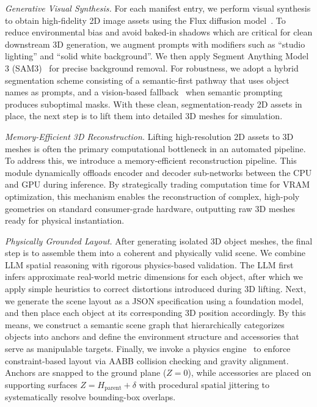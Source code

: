  \textit{Generative Visual Synthesis.} For each manifest entry, we perform visual synthesis to obtain high-fidelity 2D image assets using the Flux diffusion model~\cite{flux2024}. To reduce environmental bias and avoid baked-in shadows which are critical for clean downstream 3D generation, we augment prompts with modifiers such as ``studio lighting'' and ``solid white background''. We then apply Segment Anything Model 3 (SAM3)~\cite{carion2025sam3} for precise background removal. For robustness, we adopt a hybrid segmentation scheme consisting of a semantic-first pathway that uses object names as prompts, and a vision-based fallback~\cite{gatis2023rembg} when semantic prompting produces suboptimal masks. With these clean, segmentation-ready 2D assets in place, the next step is to lift them into detailed 3D meshes for simulation. 

 \textit{Memory-Efficient 3D Reconstruction.} Lifting high-resolution 2D assets to 3D meshes is often the primary computational bottleneck in an automated pipeline. To address this, we introduce a memory-efficient reconstruction pipeline. This module dynamically offloads encoder and decoder sub-networks between the CPU and GPU during inference. By strategically trading computation time for VRAM optimization, this mechanism enables the reconstruction of complex, high-poly geometries on standard consumer-grade hardware, outputting raw 3D meshes ready for physical instantiation.

 \textit{Physically Grounded Layout.} After generating isolated 3D object meshes, the final step is to assemble them into a coherent and physically valid scene. We combine LLM spatial reasoning with rigorous physics-based validation. The LLM first infers approximate real-world metric dimensions for each object, after which we apply simple heuristics to correct distortions introduced during 3D lifting. Next, we generate the scene layout as a JSON specification using a foundation model, and then place each object at its corresponding 3D position accordingly. By this means, we construct a semantic scene graph that hierarchically categorizes objects into anchors and define the environment structure and accessories that serve as manipulable targets. Finally, we invoke a physics engine~\cite{Genesis} to enforce constraint-based layout via AABB collision checking and gravity alignment. Anchors are snapped to the ground plane ($Z=0$), while accessories are placed on supporting surfaces $Z=H_{\text{parent}}+\delta$ with procedural spatial jittering to systematically resolve bounding-box overlaps.


